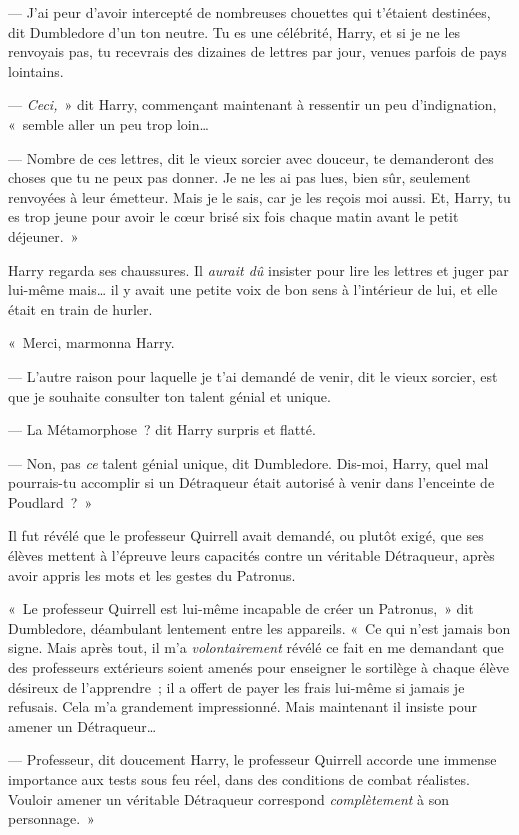 --- J'ai peur d'avoir intercepté de nombreuses chouettes qui t'étaient destinées, dit Dumbledore d'un ton neutre. Tu es une célébrité, Harry, et si je ne les renvoyais pas, tu recevrais des dizaines de lettres par jour, venues parfois de pays lointains.

--- \emph{Ceci,}~» dit Harry, commençant maintenant à ressentir un peu d'indignation, «~semble aller un peu trop loin…

--- Nombre de ces lettres, dit le vieux sorcier avec douceur, te demanderont des choses que tu ne peux pas donner. Je ne les ai pas lues, bien sûr, seulement renvoyées à leur émetteur. Mais je le sais, car je les reçois moi aussi. Et, Harry, tu es trop jeune pour avoir le cœur brisé six fois chaque matin avant le petit déjeuner.~»

Harry regarda ses chaussures. Il \emph{aurait dû} insister pour lire les lettres et juger par lui-même mais… il y avait une petite voix de bon sens à l'intérieur de lui, et elle était en train de hurler.

«~Merci, marmonna Harry.

--- L'autre raison pour laquelle je t'ai demandé de venir, dit le vieux sorcier, est que je souhaite consulter ton talent génial et unique.

--- La Métamorphose~? dit Harry surpris et flatté.

--- Non, pas \emph{ce} talent génial unique, dit Dumbledore. Dis-moi, Harry, quel mal pourrais-tu accomplir si un Détraqueur était autorisé à venir dans l'enceinte de Poudlard~?~»

\later

Il fut révélé que le professeur Quirrell avait demandé, ou plutôt exigé, que ses élèves mettent à l'épreuve leurs capacités contre un véritable Détraqueur, après avoir appris les mots et les gestes du Patronus.

«~Le professeur Quirrell est lui-même incapable de créer un Patronus,~» dit Dumbledore, déambulant lentement entre les appareils. «~Ce qui n'est jamais bon signe. Mais après tout, il m'a \emph{volontairement} révélé ce fait en me demandant que des professeurs extérieurs soient amenés pour enseigner le sortilège à chaque élève désireux de l'apprendre~; il a offert de payer les frais lui-même si jamais je refusais. Cela m'a grandement impressionné. Mais maintenant il insiste pour amener un Détraqueur…

--- Professeur, dit doucement Harry, le professeur Quirrell accorde une immense importance aux tests sous feu réel, dans des conditions de combat réalistes. Vouloir amener un véritable Détraqueur correspond \emph{complètement} à son personnage.~»

